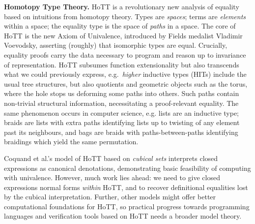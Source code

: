 \documentclass[a4paper,11pt]{article}
\begin{document}


{\bf Homotopy Type Theory.} HoTT is a revolutionary new analysis of
equality based on intuitions from homotopy theory. Types are
\emph{spaces}; terms are \emph{elements} within a space; the equality
type is the space of \emph{paths} in a space. The core of HoTT is the
new Axiom of Univalence, introduced by Fields medalist Vladimir
Voevodsky, asserting (roughly) that isomorphic types are
equal. Crucially, equality proofs carry the data necessary to program
and reason up to invariance of representation. HoTT subsumes function
extensionality but also transcends what we could previously express,
e.g.\ \emph{higher} inductive types (HITs) include the usual tree
structures, but also quotients \cite{alti:mpc04} and geometric objects such as the
torus, where the hole stops us deforming some paths into others. Such
paths contain non-trivial structural information, necessitating a
proof-relevant equality. The same phenomenon occurs in computer
science, e.g. lists are an inductive type; braids are lists with extra
paths identifying lists up to twisting of any element past its
neighbours, and bags are braids with paths-between-paths identifying
braidings which yield the same permutation.

Coquand et al.'s model of HoTT based on \emph{cubical sets} interprets closed expressions
as canonical denotations, demonstrating basic feasibility of computing
with univalence. However, much work lies ahead: we need to give
closed expressions normal forms \emph{within} HoTT, and to recover
definitional equalities lost by the cubical interpretation. Further, other models might
offer better computational foundations for HoTT, so practical progress
towards programming languages and verification tools based on HoTT
needs a broader model theory.







\end{document}
